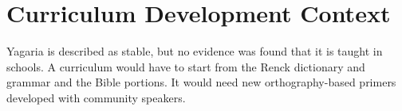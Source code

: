 \documentclass[12pt]{article}
\begin{document}
\section{Curriculum Development Context}
Yagaria is described as stable, but no evidence was found that it is taught in schools. A curriculum would have to start from the Renck dictionary and grammar and the Bible portions. It would need new orthography-based primers developed with community speakers.
\end{document}
